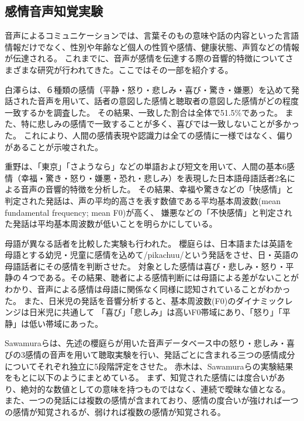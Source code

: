 \subsection{感情音声知覚実験}
\label{sec:PreviousStudy}
音声によるコミュニケーションでは、言葉そのもの意味や話の内容といった言語情報だけでなく、性別や年齢など個人の性質や感情、健康状態、声質などの情報が伝達される。
これまでに、音声が感情を伝達する際の音響的特徴についてさまざまな研究が行われてきた。ここではその一部を紹介する。

白澤らは、６種類の感情（平静・怒り・悲しみ・喜び・驚き・嫌悪）を込めて発話された音声を用いて、話者の意図した感情と聴取者の意図した感情がどの程度一致するかを調査した\cite{shirasawa1996Emo}。
その結果、一致した割合は全体で51.5\%であった。
また、特に悲しみの感情で一致することが多く、喜びでは一致しないことが多かった。
これにより、人間の感情表現や認識力は全ての感情に一様ではなく、偏りがあることが示唆された。

重野は、「東京」「さようなら」などの単語および短文を用いて、人間の基本6感情（幸福・驚き・怒り・嫌悪・恐れ・悲しみ）を表現した日本語母語話者2名による音声の音響的特徴を分析した\cite{shigeno2004Emo}。
その結果、幸福や驚きなどの「快感情」と判定された発話は、声の平均的高さを表す数値である平均基本周波数(mean fundamental frequency; mean F0)が高く、
嫌悪などの「不快感情」と判定された発話は平均基本周波数が低いことを明らかにしている。

母語が異なる話者を比較した実験も行われた。
櫻庭らは、日本語または英語を母語とする幼児・児童に感情を込めて/pikachuu/という発話をさせ、日・英語の母語話者にその感情を判断させた\cite{sakuraba2004Emo}。
対象とした感情は喜び・悲しみ・怒り・平静の４つである。その結果、聴者による感情判断には母語による差がないことがわかり、音声による感情は母語に関係なく同様に認知されていることがわかった。
また、日米児の発話を音響分析すると、基本周波数(F0)のダイナミックレンジは日米児に共通して%
「喜び」「悲しみ」は高いF0帯域にあり、「怒り」「平静」は低い帯域にあった。

Sawamuraらは、先述の櫻庭らが用いた音声データベース中の怒り・悲しみ・喜びの3感情の音声を用いて聴取実験を行い、発話ごとに含まれる三つの感情成分についてそれぞれ独立に5段階評定をさせた\cite{sawamura2007Emo}。
赤木は、Sawamuraらの実験結果をもとに以下のようにまとめている\cite{akagi2010EmoSpace}。
まず、知覚された感情には度合いがあり、絶対的な数値としての意味を持つものではなく、連続で曖昧な値となる。
また、一つの発話には複数の感情が含まれており、感情の度合いが強ければ一つの感情が知覚されるが、弱ければ複数の感情が知覚される。


